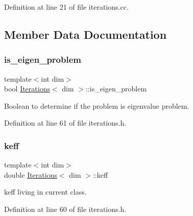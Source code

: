 Definition at line 21 of file iterations.\+cc.



\subsection{Member Data Documentation}
\mbox{\label{class_iterations_acfd49ecddab96b70fc271942b3173ad7}} 
\subsubsection{\texorpdfstring{is\+\_\+eigen\+\_\+problem}{is\_eigen\_problem}}
{\footnotesize\ttfamily template$<$int dim$>$ \\
bool \hyperlink{class_iterations}{Iterations}$<$ dim $>$\+::is\+\_\+eigen\+\_\+problem\hspace{0.3cm}{\ttfamily [private]}}



Boolean to determine if the problem is eigenvalue problem. 



Definition at line 61 of file iterations.\+h.

\mbox{\label{class_iterations_a4c36c8bdd6775be8015ef113c68a1e66}} 
\subsubsection{\texorpdfstring{keff}{keff}}
{\footnotesize\ttfamily template$<$int dim$>$ \\
double \hyperlink{class_iterations}{Iterations}$<$ dim $>$\+::keff\hspace{0.3cm}{\ttfamily [private]}}



keff living in current class. 



Definition at line 60 of file iterations.\+h.

\mbox{\label{class_iterations_a3a29339b09351ffa95e9c99be5d5e575}} 
